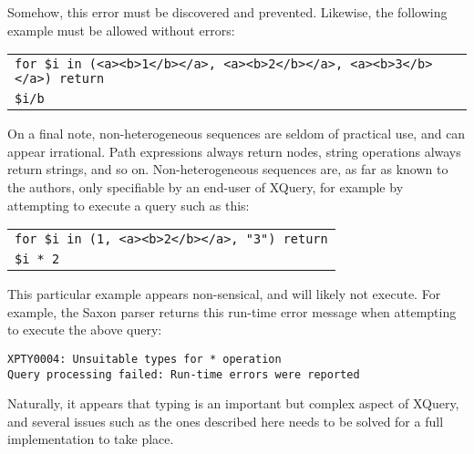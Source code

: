 Somehow, this error must be discovered and prevented. Likewise, the following
example must be allowed without errors:

\begin{center}
\begin{tabular}{l}
\texttt{for \$i in (<a><b>1</b></a>, <a><b>2</b></a>, <a><b>3</b></a>) return} \\ \quad
\texttt{\$i/b}
\end{tabular}
\end{center}

On a final note, non-heterogeneous sequences are seldom of practical use, and
can appear irrational. Path expressions always return nodes, string operations
always return strings, and so on. Non-heterogeneous sequences are, as far as
known to the authors, only specifiable by an end-user of XQuery, for example by
attempting to execute a query such as this:

\begin{center}
\begin{tabular}{l}
\texttt{for \$i in (1, <a><b>2</b></a>, "3") return} \\ \quad
\texttt{\$i * 2}
\end{tabular}
\end{center}

This particular example appears non-sensical, and will likely not execute. For
example, the Saxon parser\cite{saxproject} returns this run-time error message when attempting
to execute the above query:

\begin{Verbatim}
XPTY0004: Unsuitable types for * operation
Query processing failed: Run-time errors were reported
\end{Verbatim}

Naturally, it appears that typing is an important but complex aspect of XQuery,
and several issues such as the ones described here needs to be solved for a
full implementation to take place.


